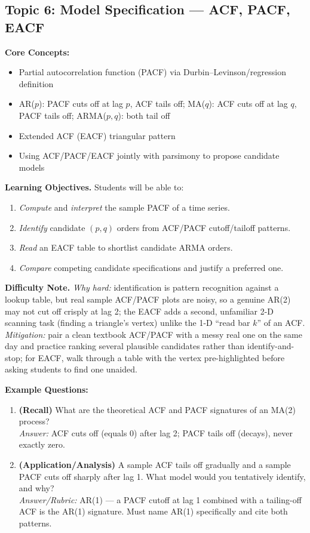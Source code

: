 \documentclass[11pt]{article}
\begin{document}
\subsection{Topic 6: Model Specification --- ACF, PACF, EACF}

\textbf{Core Concepts:}
\begin{itemize}
\item Partial autocorrelation function (PACF) via Durbin--Levinson/regression definition
\item AR($p$): PACF cuts off at lag $p$, ACF tails off; MA($q$): ACF cuts off at lag $q$, PACF tails off; ARMA($p,q$): both tail off
\item Extended ACF (EACF) triangular pattern
\item Using ACF/PACF/EACF jointly with parsimony to propose candidate models
\end{itemize}

\textbf{Learning Objectives.} Students will be able to:
\begin{enumerate}
\item \emph{Compute} and \emph{interpret} the sample PACF of a time series.
\item \emph{Identify} candidate $(p,q)$ orders from ACF/PACF cutoff/tailoff patterns.
\item \emph{Read} an EACF table to shortlist candidate ARMA orders.
\item \emph{Compare} competing candidate specifications and justify a preferred one.
\end{enumerate}

\textbf{Difficulty Note.} \emph{Why hard:} identification is pattern recognition against a lookup table, but real sample ACF/PACF plots are noisy, so a genuine AR(2) may not cut off crisply at lag 2; the EACF adds a second, unfamiliar 2-D scanning task (finding a triangle's vertex) unlike the 1-D ``read bar $k$'' of an ACF. \emph{Mitigation:} pair a clean textbook ACF/PACF with a messy real one on the same day and practice ranking several plausible candidates rather than identify-and-stop; for EACF, walk through a table with the vertex pre-highlighted before asking students to find one unaided.

\textbf{Example Questions:}
\begin{enumerate}
\item \textbf{(Recall)} What are the theoretical ACF and PACF signatures of an MA(2) process? \\
\emph{Answer:} ACF cuts off (equals 0) after lag 2; PACF tails off (decays), never exactly zero.
\item \textbf{(Application/Analysis)} A sample ACF tails off gradually and a sample PACF cuts off sharply after lag 1. What model would you tentatively identify, and why? \\
\emph{Answer/Rubric:} AR(1) --- a PACF cutoff at lag 1 combined with a tailing-off ACF is the AR(1) signature. Must name AR(1) specifically and cite both patterns.
\end{enumerate}
\end{document}
